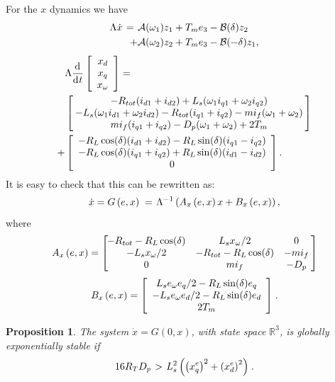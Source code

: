 \documentclass{ifacconf}
\newtheorem{proposition}[theorem]{Proposition}
\newcommand{\BE}{\begin{equation}}
\newcommand{\BEQ}[1]{\BE\label{#1}} %
\newcommand{\rline}  {{\mathbb R}}
\renewcommand{\L}    {{\Lambda}}
\renewcommand{\o}    {{\omega}}
\newcommand{\m}      {{\hbox{\hskip 1pt}}}
\newcommand{\nm}     {{\hbox{\hskip -3pt}}}
\newcommand{\dd}     {{\rm d\hbox{\hskip 0.5pt}}}
\newcommand{\Amscr}  {{\mathcal{A}}}
\newcommand{\Bmscr}  {{\mathcal{B}}}
\begin{document}
For the $x$ dynamics we have
$$ \begin{aligned} \L\dot{x} \m=\m & \Amscr(\o_1) z_1 + T_m e_3
   -\Bmscr(\delta) z_2\\ +& \Amscr(\o_2) z_2 + T_m e_3-\Bmscr
   (-\delta) z_1, \end{aligned}$$
\vspace{-2mm}
$$ \begin{aligned} &\L \frac{\dd}{\dd t}\left[\begin{array}{c}
   x_{d}\\ x_{q}\\ x_{\o} \end{array}\right] = \\ & \left[\nm
   \begin{array}{c} - R_{tot}(i_{d1}+i_{d2})+L_s(\o_1 i_{q1}
   +\o_2 i_{q2})\\ -L_s(\o_1 i_{d1}+\o_2 i_{d2})-R_{tot}(i_{q1} +
   i_{q2})-m i_f(\o_1+\o_2)\\ m i_f(i_{q1}+i_{q2})-D_p(\o_1+\o_2) +
   2T_m \end{array}\nm\right]\\ +& \left[ \begin{array}{c}
   -R_L\cos(\delta)(i_{d1}+i_{d2})-R_L\sin(\delta)(i_{q1}-i_{q2})\\
   -R_L\cos(\delta)(i_{q1}+i_{q2})+R_L\sin(\delta)(i_{d1}-i_{d2})\\
   0 \end{array}\right]. \end{aligned}$$
It is easy to check that this can be rewritten as:
\BEQ{uj_iroda_szek}
   \dot{x}=G \left( e,x\right) \m=\m \L^{-1}\left(A_x \left(e,x 
   \right) x + B_x \left( e,x\right) \right),
\end{equation}
where
$$ A_x \left(e,x \right) = \left[\nm\nm\begin{array}{ccc}
   -R_{tot}-R_L\cos(\delta) & L_s x_\o/2 & 0\\
   -L_s x_\o/2 & -R_{tot}-R_L\cos(\delta) & -mi_f\\
   0 & mi_f & -D_p\end{array} \nm\right]$$
$$ B_x \left(e,x \right)=\left[\begin{array}{c} L_s e_\o e_q/2
   -R_L\sin(\delta)e_q\\ -L_s e_\o e_d/2 - R_{L}\sin(\delta)
   e_d\\ 2T_m \end{array}\right] \m.$$

\begin{proposition} \label{megyek_Sde_Bokerbe}
The system $\dot x=G(0,x)$, with state space $\rline^3$, is 
globally exponentially stable if 
\begin{equation} \label{eq:condition_for_stable_G}
   16 R_T D_p \m>\m L_s^2 \left( \left(x_q^e\right)^2+\left( x_d^e
   \right)^2\right) \m.
\end{equation}
\end{proposition}
\end{document}
